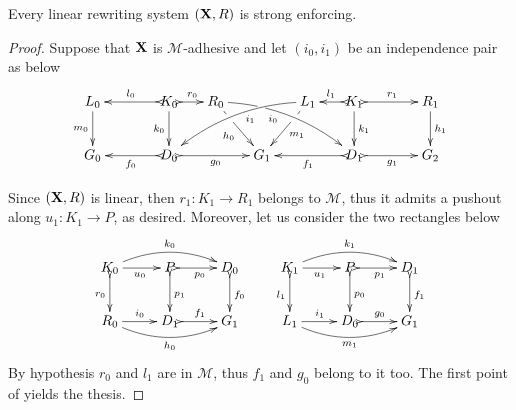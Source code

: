 \documentclass[a4paper,UKenglish,cleveref,pdftex,thm-restate,numberwithinsect]{lipics-v2021}
\def\R{\mathsf{R}}
\def\X{\textbf {\textup{X}}}
\def\G{\textbf {\textup{G}}}
\begin{document}
\begin{proposition}
  \label{prop:equi}
  Every linear rewriting system $(\X, \R)$ is strong enforcing.
\end{proposition}


\begin{proof}
  Suppose that $\X$ is $\mathcal{M}$-adhesive and let $(i_0, i_1)$ be
  an independence pair as below
  \[
    \xymatrix@C=15pt{L_0 \ar[d]_{m_0}&& K_0
      \ar[d]_{k_0}\ar@{>->}[ll]_{l_0} \ar@{>->}[r]^{r_0} & R_0
      \ar@/^.35cm/[drrr]|(.3)\hole_(.4){i_0} \ar[dr]|(.3)\hole_{h_0}
      && L_1 \ar@/_.35cm/[dlll]^(.4){i_1} \ar[dl]|(.3)\hole^{m_1}& K_1
      \ar[d]^{k_1}\ar@{>->}[l]_{l_1} \ar@{>->}[rr]^{r_1} && R_1
      \ar[d]^{h_1} \\G_0 && \ar@{>->}[ll]^{f_0} D_0
      \ar@{>->}[rr]_{g_0}&& G_1 && \ar@{>->}[ll]^{f_1} D_1
      \ar@{>->}[rr]_{g_1}&& G_2}\]

  Since $(\X, \R)$ is linear, then $r_1\colon K_1\to R_1$ belongs to
  $\mathcal{M}$, thus it admits a pushout along $u_1\colon K_1\to P$,
  as desired. Moreover, let us consider the two rectangles below
  \[
    \xymatrix{K_0 \ar@/^.4cm/[rr]^{k_0}\ar@{>->}[d]_{r_0}\ar[r]_{u_0}
      &P\ar@{>->}[d]^{p_1} \ar@{>->}[r]_{p_0} & D_0
      \ar@{>->}[d]^{f_0}& K_1
      \ar@/^.4cm/[rr]^{k_1}\ar@{>->}[d]_{l_1}\ar[r]_{u_1}
      &P\ar@{>->}[d]^{p_0} \ar@{>->}[r]_{p_1} & D_1
      \ar@{>->}[d]^{f_1}\\ R_0 \ar@/_.4cm/[rr]_{h_0} \ar[r]^{i_0}&D_1
      \ar@{>->}[r]^{f_1} & G_1& L_1 \ar@/_.4cm/[rr]_{m_1}
      \ar[r]^{i_1}&D_0 \ar@{>->}[r]^{g_0} & G_1} \] By hypothesis
  $r_0$ and $l_1$ are in $\mathcal{M}$, thus $f_1$ and $g_0$ belong to
  it too. The first point of  yields the thesis.
\end{proof}
\end{document}
